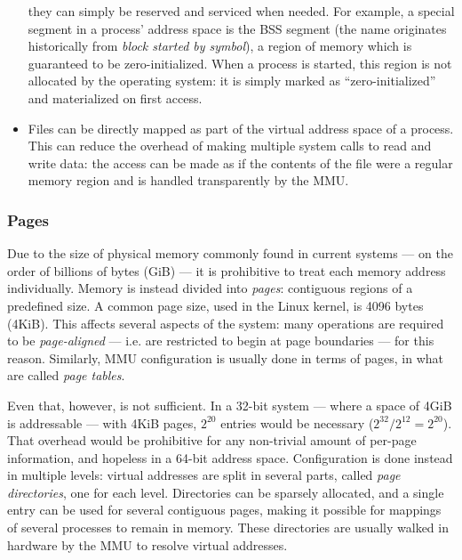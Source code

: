 \begin{itemize}
        they can simply be reserved and serviced when needed.  For example, a
        special segment in a process' address space is the BSS segment (the name
        originates historically from \textit{block started by symbol}), a region
        of memory which is guaranteed to be zero-initialized\footnotemark.  When
        a process is started, this region is not allocated by the operating
        system: it is simply marked as ``zero-initialized'' and materialized on
        first access.
    \item
        Files can be directly mapped as part of the virtual address space of a
        process.  This can reduce the overhead of making multiple system calls
        to read and write data: the access can be made as if the contents of the
        file were a regular memory region and is handled transparently by the
        MMU.
\end{itemize}

\subsubsection{Pages}

Due to the size of physical memory commonly found in current systems --- on the
order of billions of bytes (GiB) --- it is prohibitive to treat each memory
address individually.  Memory is instead divided into \textit{pages}: contiguous
regions of a predefined size.  A common page size, used in the Linux kernel, is
4096 bytes (4KiB)\footnotemark.  This affects several aspects of the system:
many operations are required to be \textit{page-aligned} --- i.e. are restricted
to begin at page boundaries --- for this reason.  Similarly, MMU configuration
is usually done in terms of pages, in what are called \textit{page tables}.


Even that, however, is not sufficient.  In a 32-bit system --- where a space of
4GiB is addressable --- with 4KiB pages, $2^{20}$ entries would be necessary
($2^{32}/2^{12} = 2^{20}$).  That overhead would be prohibitive for any
non-trivial amount of per-page information, and hopeless in a 64-bit address
space.  Configuration is done instead in multiple levels: virtual addresses are
split in several parts, called \textit{page directories}, one for each level.
Directories can be sparsely allocated, and a single entry can be used for
several contiguous pages, making it possible for mappings of several processes
to remain in memory\footnotemark.  These directories are usually walked in
hardware by the MMU to resolve virtual addresses.

